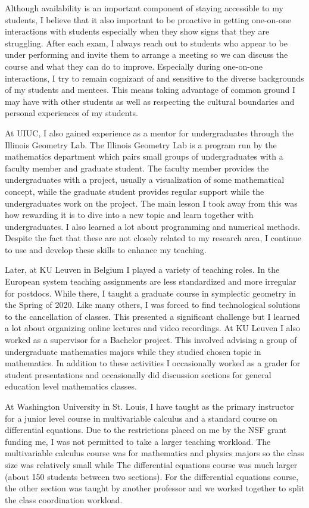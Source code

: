 \documentclass{article}
\begin{document}
Although availability is an important component of staying accessible to my students, I believe that it also important to be proactive in getting one-on-one interactions with students especially when they show signs that they are struggling.
After each exam, I always reach out to students who appear to be under performing and invite them to arrange a meeting so we can discuss the course and what they can do to improve.
Especially during one-on-one interactions, I try to remain cognizant of and sensitive to the diverse backgrounds of my students and mentees.
This means taking advantage of common ground I may have with other students as well as respecting the cultural boundaries and personal experiences of my students.

At UIUC, I also gained experience as a mentor for undergraduates through the Illinois Geometry Lab. The Illinois Geometry Lab is a program run by the mathematics department which pairs small groups of undergraduates with a faculty member and graduate student. The faculty member provides the undergraduates with a project, usually a visualization of some mathematical concept, while the graduate student provides regular support while the undergraduates work on the project. The main lesson I took away from this was how rewarding it is to dive into a new topic and learn together with undergraduates. I also learned a lot about programming and numerical methods. Despite the fact that these are not closely related to my research area, I continue to use and develop these skills to enhance my teaching.

Later, at KU Leuven in Belgium I played a variety of teaching roles. In the European system teaching assignments are less standardized and more irregular for postdocs. While there, I taught a graduate course in symplectic geometry in the Spring of 2020. Like many others, I was forced to find technological solutions to the cancellation of classes. This presented a significant challenge but I learned a lot about organizing online lectures and video recordings. At KU Leuven I also worked as a supervisor for a Bachelor project. This involved advising a group of undergraduate mathematics majors while they studied chosen topic in mathematics. In addition to these activities I occasionally worked as a grader for student presentations and occasionally did discussion sections for general education level mathematics classes.

At Washington University in St. Louis, I have taught as the primary instructor for a junior level course in multivariable calculus and a standard course on differential equations. Due to the restrictions placed on me by the NSF grant funding me, I was not permitted to take a larger teaching workload. The multivariable calculus course was for mathematics and physics majors so the class size was relatively small while The differential equations course was much larger (about 150 students between two sections). For the differential equations course, the other section was taught by another professor and we worked together to split the class coordination workload.
\end{document}
